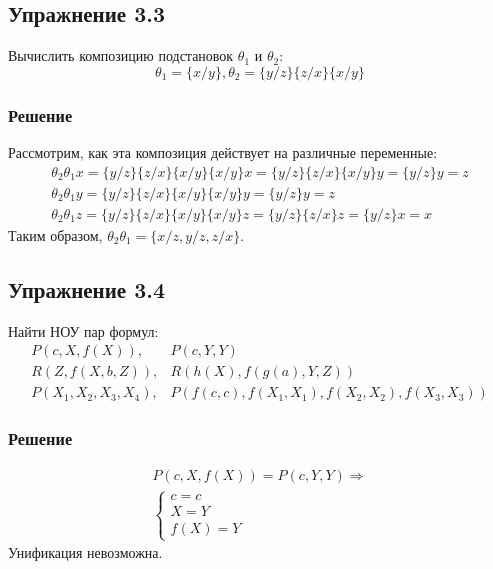 \documentclass[11pt]{article}
\newcounter{th}\setcounter{th}{0}
\begin{document}
\subsection{Упражнение 3.3}
\label{sec:org081e7ee}
Вычислить композицию подстановок $\theta_1$ и $\theta_2$:
\begin{equation*}
\theta_1 = \{x/y\}, \theta_2 = \{y/z\}\{z/x\}\{x/y\}
\end{equation*}
\subsubsection{Решение}
\label{sec:org8e34a88}
Рассмотрим, как эта композиция действует на различные переменные:
\begin{gather*}
\theta_2\theta_1x = \{y/z\}\{z/x\}\{x/y\}\{x/y\}x = \{y/z\}\{z/x\}\{x/y\}y = \{y/z\}y = z \\
\theta_2\theta_1y = \{y/z\}\{z/x\}\{x/y\}\{x/y\}y = \{y/z\}y = z \\
\theta_2\theta_1z = \{y/z\}\{z/x\}\{x/y\}\{x/y\}z = \{y/z\}\{z/x\}z = \{y/z\}x = x
\end{gather*}
Таким образом, \(\theta_2\theta_1 = \{x/z, y/z, z/x\}\).
\subsection{Упражнение 3.4}
\label{sec:org7ef64c8}
Найти НОУ пар формул:
\begin{align*}
P(c, X, f(X)), & P(c, Y, Y) \\
R(Z, f(X, b, Z)), & R(h(X), f(g(a), Y, Z)) \\
P(X_1, X_2, X_3, X_4), & P(f(c, c), f(X_1, X_1), f(X_2, X_2), f(X_3, X_3))
\end{align*}
\subsubsection{Решение}
\label{sec:org847785f}
\begin{gather*}
P(c, X, f(X)) = P(c, Y, Y) \Rightarrow \\
\begin{cases}
c = c \\
X = Y \\
f(X) = Y
\end{cases}
\end{gather*}
Унификация невозможна.
\end{document}
